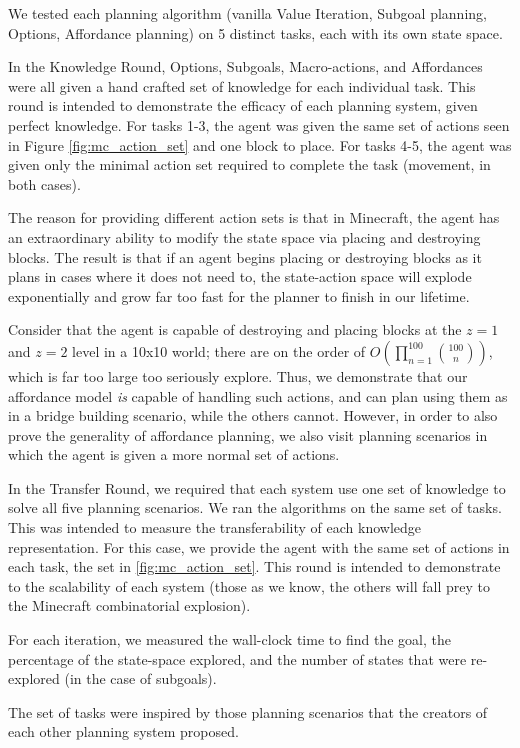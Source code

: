 \documentclass[]{article}
\begin{document}
We tested each planning algorithm (vanilla Value Iteration, Subgoal planning, Options, Affordance planning) on 5 distinct tasks, each with its own state space.

In the Knowledge Round, Options, Subgoals, Macro-actions, and Affordances were all given a hand crafted set of knowledge for each individual task. This round is intended to demonstrate the efficacy of each planning system, given perfect knowledge. For tasks 1-3, the agent was given the same set of actions seen in Figure \ref{fig:mc_action_set} and one block to place. For tasks 4-5, the agent was given only the minimal action set required to complete the task (movement, in both cases). 

The reason for providing different action sets is that in Minecraft, the agent has an extraordinary ability to modify the state space via placing and destroying blocks. The result is that if an agent begins placing or destroying blocks as it plans in cases where it does not need to, the state-action space will explode exponentially and grow far too fast for the planner to finish in our lifetime. 

Consider that the agent is capable of destroying and placing blocks at the $z = 1$ and $z = 2$ level in a 10x10 world; there are on the order of $O\left(\prod_{n=1}^{100} \binom{100}{n}\right)$, which is far too large too seriously explore. Thus, we demonstrate that our affordance model {\it is} capable of handling such actions, and can plan using them as in a bridge building scenario, while the others cannot. However, in order to also prove the generality of affordance planning, we also visit planning scenarios in which the agent is given a more normal set of actions.

In the Transfer Round, we required that each system use one set of knowledge to solve all five planning scenarios. We ran the algorithms on the same set of tasks. This was intended to measure the transferability of each knowledge representation. For this case, we provide the agent with the same set of actions in each task, the set in \ref{fig:mc_action_set}. This round is intended to demonstrate to the scalability of each system (those as we know, the others will fall prey to the Minecraft combinatorial explosion).

For each iteration, we measured the wall-clock time to find the goal, the percentage of the state-space explored, and the number of states that were re-explored (in the case of subgoals).

The set of tasks were inspired by those planning scenarios that the creators of each other planning system proposed. \\ \\
\end{document}
